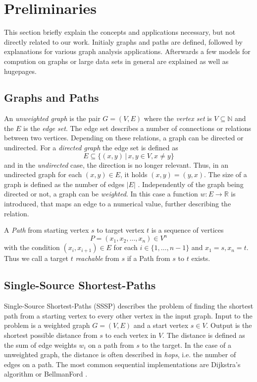 
\section{Preliminaries}
This section briefly explain the concepts and applications necessary, but not directly related to our work.
Initialy graphs and paths are defined, followed by explanations for various graph analysis applications.
Afterwards a few models for compution on graphs or large data sets in general are explained as well as hugepages.

\subsection{Graphs and Paths}
An \emph{unweighted graph} is the pair $G=(V,E)$ where the \emph{vertex set} is $V\subseteq\mathbb N$ and the $E$ is the \emph{edge set}.
The edge set describes a number of connections or relations between two vertices. Depending on these relations, a graph can be directed or undirected. For a \emph{directed graph} the edge set is defined as
\begin{equation*}
  E\subseteq\{(x,y)\,|\, x,y\in V, x\neq y\}
\end{equation*}
and in the \emph{undirected} case, the direction is no longer relevant. Thus, in an undirected graph for each $(x,y)\in E$, it holds $(x,y)=(y,x)$.
The size of a graph is defined as the number of edges $|E|$ \cite{newman2010networks}.
Independently of the graph being directed or not, a graph can be \emph{weighted}. In this case a function $w:E\rightarrow \mathbb R$ is introduced, that maps an edge to a numerical value, further describing the relation.

A \emph{Path} from starting vertex $s$ to target vertex $t$ is a sequence of vertices
\begin{equation*}
	P=(x_1,x_2,\ldots,x_n)\in V^n
\end{equation*}
with the condition $(x_i,x_{i+1})\in E$ for each $i\in\{1,\ldots,n-1\}$ and $x_1=s, x_n=t$.
Thus we call a target $t$ \emph{reachable} from $s$ if a Path from $s$ to $t$ exists.

\subsection{Single-Source Shortest-Paths}
Single-Source Shortest-Paths (SSSP) describes the problem of finding the shortest path from a starting vertex to every other vertex in the input graph.
Input to the problem is a weighted graph $G=(V,E)$ and a start vertex $s\in V$. Output is the shortest possible distance from $s$ to each vertex in $V$.
The distance is defined as the sum of edge weights $w_i$ on a path from $s$ to the target.
In the case of a unweighted graph, the distance is often described in \emph{hops}, i.e. the number of edges on a path.
The most common sequential implementations are Dijkstra's algorithm or BellmanFord \cite{Polymer, Ligra, pregel}.

